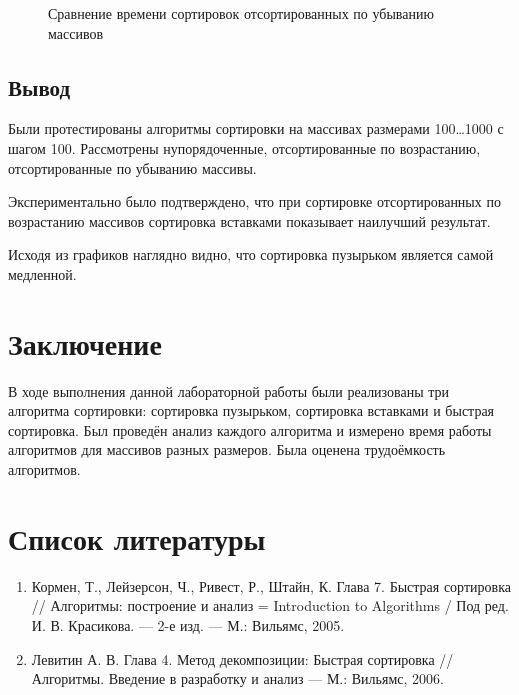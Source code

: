\documentclass[12pt]{report}
\begin{document}
\begin{figure}
    \centering
{}
\caption{Сравнение времени сортировок отсортированных по убыванию массивов} 
\label{plot:SortedDown}
\end{figure}

\newpage
\section{Вывод}
Были протестированы алгоритмы сортировки на массивах размерами 100…1000 с шагом 100. Рассмотрены нупорядоченные, отсортированные по возрастанию, отсортированные по убыванию массивы.

Экспериментально было подтверждено, что при сортировке отсортированных по возрастанию массивов сортировка вставками показывает наилучший результат.

Исходя из графиков наглядно видно, что сортировка пузырьком является самой медленной.

\chapter*{Заключение}
В ходе выполнения данной лабораторной работы были реализованы три алгоритма сортировки: сортировка пузырьком, сортировка вставками и быстрая сортировка. Был проведён анализ каждого алгоритма и измерено время работы алгоритмов для массивов разных размеров. Была оценена трудоёмкость алгоритмов.


\chapter*{Список литературы}
\begin{enumerate}
    \item  Кормен, Т., Лейзерсон, Ч., Ривест, Р., Штайн, К. Глава 7. Быстрая сортировка // Алгоритмы: построение и анализ = Introduction to Algorithms / Под ред. И. В. Красикова. — 2-е изд. — М.: Вильямс, 2005.
    \item Левитин А. В. Глава 4. Метод декомпозиции: Быстрая сортировка // Алгоритмы. Введение в разработку и анализ — М.: Вильямс, 2006. 
\end{enumerate}
\end{document}
